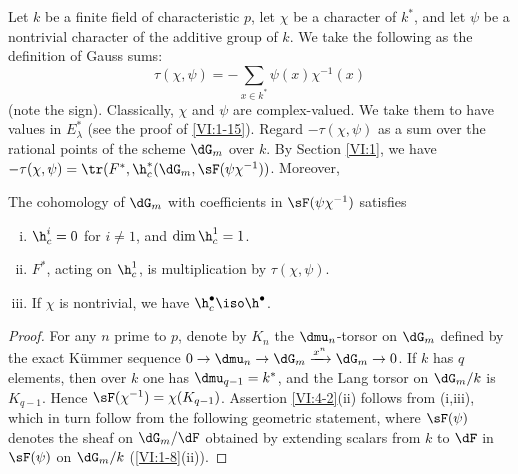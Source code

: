 Let $k$ be a finite field of characteristic $p$, let $\chi$ be a character of 
$k^\ast$, and let $\psi$ be a nontrivial character of the additive group of $k$. 
We take the following as the definition of Gauss sums: 
\begin{equation*}\tag{4.1.1}\label{VI:eq:4-1-1}
  \tau(\chi,\psi) = -\sum_{x\in k^\ast} \psi(x) \chi^{-1}(x) 
\end{equation*}
(note the sign). Classically, $\chi$ and $\psi$ are complex-valued. 
We take them to have values in $E_\lambda^\ast$ (see the proof of 
\ref{VI:1-15}). Regard $-\tau(\chi,\psi)$ as a sum over the rational 
points of the scheme $\dG_m$ over $k$. By Section \ref{VI:1}, 
we have $-\tau(\chi,\psi) = \tr(F^\ast,\h_c^\ast(\dG_m,\sF(\psi \chi^{-1}))$. Moreover,

\begin{proposition_}\label{VI:4-2}
The cohomology of $\dG_m$ with coefficients in $\sF(\psi\chi^{-1})$ satisfies 
\begin{enumerate}[(i)]
  \item $\h_c^i=0$ for $i\ne 1$, and $\dim \h_c^1=1$. 
  \item $F^\ast$, acting on $\h_c^1$, is multiplication by 
    $\tau(\chi,\psi)$. 
  \item If $\chi$ is nontrivial, we have $\h_c^\bullet \iso \h^\bullet$. 
\end{enumerate}
\end{proposition_}
\begin{proof}[Proof]
For any $n$ prime to $p$, denote by $K_n$ the $\dmu_n$-torsor on $\dG_m$ 
defined by the exact K\"ummer sequence 
$0 \to \dmu_n \to \dG_m \xrightarrow{x^n} \dG_m \to 0$. If $k$ has $q$ 
elements, then over $k$ one has $\dmu_{q-1}=k^\ast$, and the Lang torsor on 
$\dG_m/k$ is $K_{q-1}$. Hence $\sF(\chi^{-1})=\chi(K_{q-1})$. 
Assertion \ref{VI:4-2}(ii) follows from (i,iii), which in turn follow from 
the following geometric statement, where $\sF(\psi)$ denotes the sheaf 
on $\dG_m/\dF$ obtained by extending scalars from $k$ to $\dF$ in 
$\sF(\psi)$ on $\dG_m/k$ (\ref{VI:1-8}(ii)). 
\end{proof}





